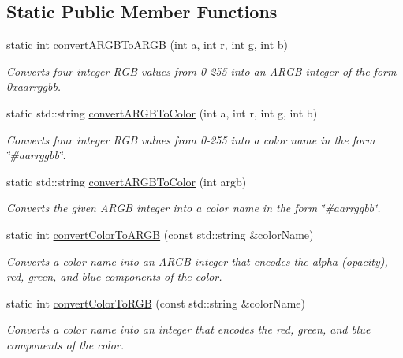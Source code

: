 \subsection*{Static Public Member Functions}
\begin{DoxyCompactItemize}
\item 
static int \mbox{\hyperlink{classGColor_a9678f670b71cc46a68b746bda9765f4b}{convert\+A\+R\+G\+B\+To\+A\+R\+GB}} (int a, int r, int g, int b)
\begin{DoxyCompactList}\small\item\em Converts four integer R\+GB values from 0-\/255 into an A\+R\+GB integer of the form {\ttfamily 0xaarrggbb}. \end{DoxyCompactList}\item 
static std\+::string \mbox{\hyperlink{classGColor_abc3a0188f264217b768e4a9a63fbc54e}{convert\+A\+R\+G\+B\+To\+Color}} (int a, int r, int g, int b)
\begin{DoxyCompactList}\small\item\em Converts four integer R\+GB values from 0-\/255 into a color name in the form {\ttfamily \char`\"{}\#aarrggbb\char`\"{}}. \end{DoxyCompactList}\item 
static std\+::string \mbox{\hyperlink{classGColor_aba032cfdc6b7936c6b828f8dfc2a9a90}{convert\+A\+R\+G\+B\+To\+Color}} (int argb)
\begin{DoxyCompactList}\small\item\em Converts the given A\+R\+GB integer into a color name in the form {\ttfamily \char`\"{}\#aarrggbb\char`\"{}}. \end{DoxyCompactList}\item 
static int \mbox{\hyperlink{classGColor_a5efa1612c4ccfff89eca4ed3cfd0206d}{convert\+Color\+To\+A\+R\+GB}} (const std\+::string \&color\+Name)
\begin{DoxyCompactList}\small\item\em Converts a color name into an A\+R\+GB integer that encodes the alpha (opacity), red, green, and blue components of the color. \end{DoxyCompactList}\item 
static int \mbox{\hyperlink{classGColor_aab4a1480d396f913220aea51d117eb94}{convert\+Color\+To\+R\+GB}} (const std\+::string \&color\+Name)
\begin{DoxyCompactList}\small\item\em Converts a color name into an integer that encodes the red, green, and blue components of the color. \end{DoxyCompactList}\item 

\end{DoxyCompactItemize}
